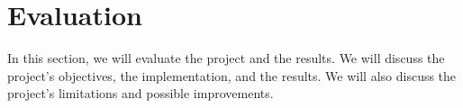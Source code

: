 \section{Evaluation}

In this section, we will evaluate the project and the results. We will discuss the project's objectives, the implementation, and the results. We will also discuss the project's limitations and possible improvements.
